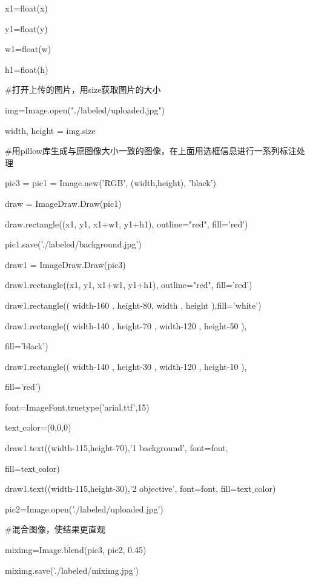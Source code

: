 \documentclass[bachelor_p]{hdu-thesis}
\begin{document}
\qquad \qquad x1=float(x)

\qquad \qquad y1=float(y)

\qquad \qquad w1=float(w)

\qquad \qquad h1=float(h)
            
$\#$打开上传的图片，用size获取图片的大小

\qquad \qquad img=Image.open("./labeled/uploaded.jpg")

\qquad \qquad width, height = img.size
            
$\#$用pillow库生成与原图像大小一致的图像，在上面用选框信息进行一系列标注处理

\qquad \qquad pic3 = pic1 = Image.new('RGB', (width,height), 'black')
            
\qquad \qquad draw = ImageDraw.Draw(pic1)

\qquad \qquad draw.rectangle((x1, y1, x1+w1, y1+h1), outline="red", fill='red')

\qquad \qquad pic1.save('./labeled/background.jpg')
            
\qquad \qquad draw1 = ImageDraw.Draw(pic3)

\qquad \qquad draw1.rectangle((x1, y1, x1+w1, y1+h1), outline="red", fill='red')

\qquad \qquad draw1.rectangle(( width-160 , height-80, width , height ),fill='white')

\qquad \qquad draw1.rectangle(( width-140 , height-70 , width-120 , height-50 ), 

\qquad \qquad fill='black')

\qquad \qquad draw1.rectangle(( width-140 , height-30 , width-120 , height-10 ), 

\qquad \qquad fill='red')

            
\qquad \qquad font=ImageFont.truetype('arial.ttf',15)

\qquad \qquad text$\_$color=(0,0,0)

\qquad \qquad draw1.text((width-115,height-70),'1 background', font=font, 

\qquad \qquad fill=text$\_$color)

\qquad \qquad draw1.text((width-115,height-30),'2 objective', font=font, fill=text$\_$color)

            
\qquad \qquad pic2=Image.open('./labeled/uploaded.jpg')

$\#$混合图像，使结果更直观

\qquad \qquad miximg=Image.blend(pic3, pic2, 0.45)

\qquad \qquad miximg.save('./labeled/miximg.jpg')
\end{document}
